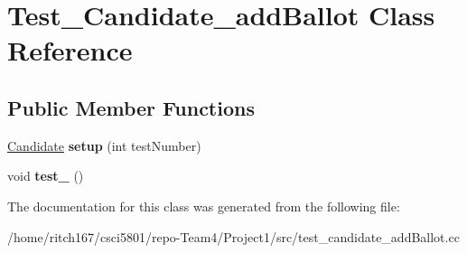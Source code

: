 \hypertarget{classTest__Candidate__addBallot}{}\section{Test\+\_\+\+Candidate\+\_\+add\+Ballot Class Reference}
\label{classTest__Candidate__addBallot}
\subsection*{Public Member Functions}
\begin{DoxyCompactItemize}
\item 
\mbox{\label{classTest__Candidate__addBallot_a58e62542c5c2276836cdafb68e4035ad}} 
\hyperlink{classCandidate}{Candidate} {\bfseries setup} (int test\+Number)
\item 
\mbox{\label{classTest__Candidate__addBallot_a756120432c84db096de87d714e85b733}} 
void {\bfseries test\+\_} ()
\end{DoxyCompactItemize}


The documentation for this class was generated from the following file\+:\begin{DoxyCompactItemize}
\item 
/home/ritch167/csci5801/repo-\/\+Team4/\+Project1/src/test\+\_\+candidate\+\_\+add\+Ballot.\+cc\end{DoxyCompactItemize}
